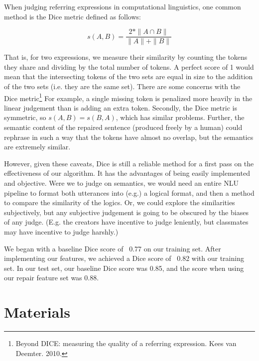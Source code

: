 \documentclass{article}
\begin{document}
\begin{flushleft}
 
  When judging referring expressions in computational linguistics, one common method is the Dice metric defined as follows:

  $$s(A,B)=\frac{2*\| A\cap B\|}{\| A\| +\| B\| }$$

  That is, for two expressions, we measure their similarity by counting the tokens they share and dividing by the total number of tokens. A perfect score of 1 would mean that the intersecting tokens of the two sets are equal in size to the addition of the two sets (i.e. they are the same set). There are some concerns with the Dice metric\footnote{Beyond DICE: measuring the quality of a referring expression. Kees van Deemter. 2010.} For example, a single missing token is penalized more heavily in the linear judgement than is adding an extra token. Secondly, the Dice metric is symmetric, so $s(A, B) = s(B, A)$, which has similar problems. Further, the semantic content of the repaired sentence (produced freely by a human) could rephrase in such a way that the tokens have almost no overlap, but the semantics are extremely similar.

  However, given these caveats, Dice is still a reliable method for a first pass on the effectiveness of our algorithm. It has the advantages of being easily implemented and objective. Were we to judge on semantics, we would need an entire NLU pipeline to format both utterances into (e.g.) a logical format, and then a method to compare the similarity of the logics. Or, we could explore the similarities subjectively, but any subjective judgement is going to be obscured by the biases of any judge. (E.g. the creators have incentive to judge leniently, but classmates may have incentive to judge harshly.)
  
\end{flushleft}

\begin{flushleft}

We began with a baseline Dice score of ~0.77 on our training set. After implementing our features, we achieved a Dice score of ~0.82 with our training set. In our test set, our baseline Dice score was 0.85, and the score when using our repair feature set was 0.88.

\end{flushleft}  


\section{Materials}
\end{document}
